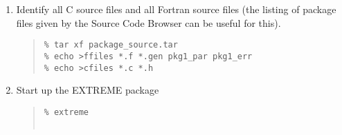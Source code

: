 \documentclass[twoside,11pt]{article}
\newcommand{\htmladdnormallink}[2]{#1}
\renewcommand{\_}{\texttt{\symbol{95}}}
\newenvironment{squote}{\begin{quote}\begin{small}}{\end{small}\end{quote}}
\begin{document}
\begin{enumerate}
%
\item
Identify all C source files and all Fortran source files
(the listing of package files given by the
\htmladdnormallink{Source Code 
 Browser}{http://capc23.ast.cam.ac.uk/cgi-bin/scb}
can be useful for this).
\begin{squote}
\begin{verbatim}
% tar xf package_source.tar
% echo >ffiles *.f *.gen pkg1_par pkg1_err
% echo >cfiles *.c *.h
\end{verbatim}
\end{squote}
%
\item
Start up the EXTREME package
\begin{squote}
\begin{verbatim}
% extreme
 

\end{verbatim}
\end{squote}
\end{enumerate}
\end{document}
